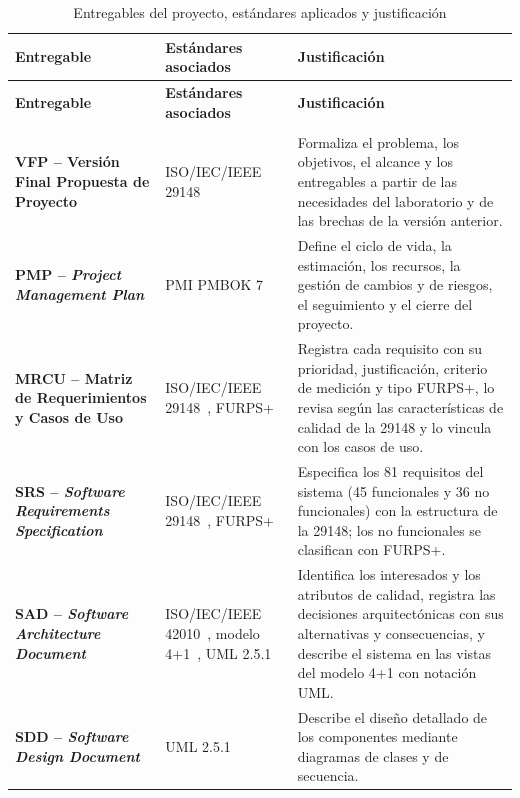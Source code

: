 \documentclass[12pt,letterpaper,oneside]{article}
\begin{document}
\begingroup
\small{}
\renewcommand{\arraystretch}{1.3}
\setlength{\LTcapwidth}{\textwidth}
\begin{longtable}{|>{\raggedright\arraybackslash}p{}|>{\raggedright\arraybackslash}p{}|>{\raggedright\arraybackslash}p{}|}
\hline
\textbf{Entregable} & \textbf{Estándares asociados} & \textbf{Justificación} \\
\hline
\endfirsthead
\hline
\textbf{Entregable} & \textbf{Estándares asociados} & \textbf{Justificación} \\
\hline
\endhead
\endfoot
\caption{Entregables del proyecto, estándares aplicados y justificación}
\label{tab:entregables} \\
\endlastfoot
\textbf{VFP -- Versión Final Propuesta de Proyecto} & ISO/IEC/IEEE 29148~\cite{iso29148} & Formaliza el problema, los objetivos, el alcance y los entregables a partir de las necesidades del laboratorio y de las brechas de la versión anterior. \\
\hline
\textbf{PMP -- \textit{Project Management Plan}} & PMI PMBOK 7~\cite{pmbok7} & Define el ciclo de vida, la estimación, los recursos, la gestión de cambios y de riesgos, el seguimiento y el cierre del proyecto. \\
\hline
\textbf{MRCU -- Matriz de Requerimientos y Casos de Uso} & ISO/IEC/IEEE 29148~\cite{iso29148}, FURPS+~\cite{eeles2001} & Registra cada requisito con su prioridad, justificación, criterio de medición y tipo FURPS+, lo revisa según las características de calidad de la 29148 y lo vincula con los casos de uso. \\
\hline
\textbf{SRS -- \textit{Software Requirements Specification}} & ISO/IEC/IEEE 29148~\cite{iso29148}, FURPS+~\cite{eeles2001} & Especifica los 81 requisitos del sistema (45 funcionales y 36 no funcionales) con la estructura de la 29148; los no funcionales se clasifican con FURPS+. \\
\hline
\textbf{SAD -- \textit{Software Architecture Document}} & ISO/IEC/IEEE 42010~\cite{iso42010}, modelo 4+1~\cite{kruchten1995}, UML 2.5.1~\cite{omg_uml} & Identifica los interesados y los atributos de calidad, registra las decisiones arquitectónicas con sus alternativas y consecuencias, y describe el sistema en las vistas del modelo 4+1 con notación UML. \\
\hline
\textbf{SDD -- \textit{Software Design Document}} & UML 2.5.1~\cite{omg_uml} & Describe el diseño detallado de los componentes mediante diagramas de clases y de secuencia. \\

\end{longtable}
\end{document}
